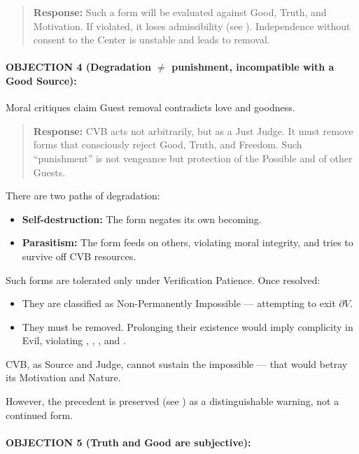 \documentclass[12pt]{article}
\begin{document}
\begin{quote}
\textbf{Response:} Such a form will be evaluated against Good, Truth, and Motivation. If violated, it loses admissibility (see \text{[24.4]}). Independence without consent to the Center is unstable and leads to removal.
\end{quote}

\paragraph{OBJECTION 4 (Degradation $\neq$ punishment, incompatible with a Good Source):}

Moral critiques claim Guest removal contradicts love and goodness.

\begin{quote}
\textbf{Response:} CVB acts not arbitrarily, but as a Just Judge. It must remove forms that consciously reject Good, Truth, and Freedom. Such ``punishment'' is not vengeance but protection of the Possible and of other Guests.
\end{quote}

There are two paths of degradation:

\begin{itemize}
\item \textbf{Self-destruction:} The form negates its own becoming.
\item \textbf{Parasitism:} The form feeds on others, violating moral integrity, and tries to survive off CVB resources.
\end{itemize}

Such forms are tolerated only under Verification Patience. Once resolved:

\begin{itemize}
\item They are classified as \text{[4.2]} Non-Permanently Impossible — attempting to exit $\partial V$.
\item They must be removed. Prolonging their existence would imply complicity in Evil, violating \text{[13]}, \text{[18]}, \text{[22]}, and \text{[11.3.3]}.
\end{itemize}

CVB, as Source and Judge, cannot sustain the impossible — that would betray its Motivation and Nature.

However, the precedent is preserved (see \text{[16]}) as a distinguishable warning, not a continued form.

\paragraph{OBJECTION 5 (Truth and Good are subjective):}
\end{document}

